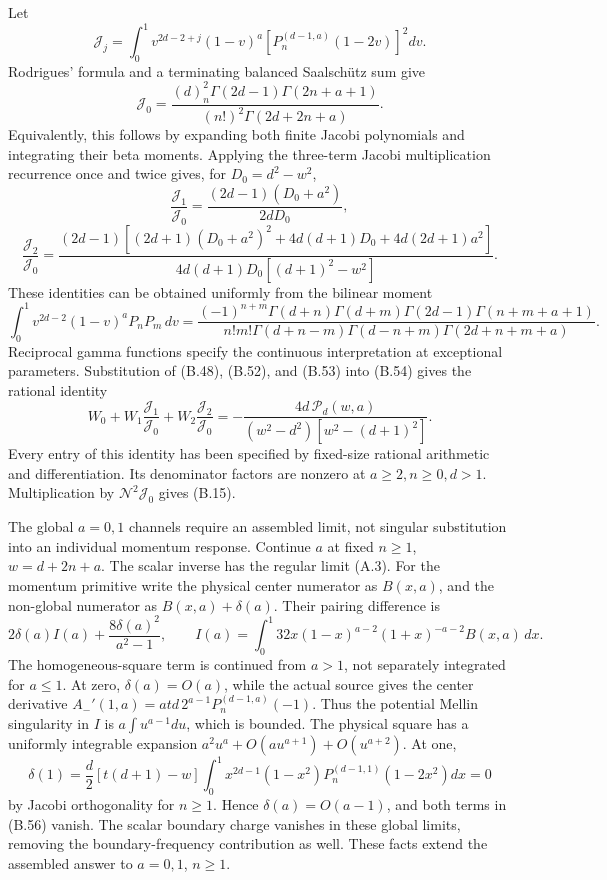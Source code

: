 \documentclass[a4paper,11pt]{article}
\numberwithin{equation}{section}
\begin{document}
Let \[
\mathcal J_j=\int_0^1v^{2d-2+j}(1-v)^a
[P_n^{(d-1,a)}(1-2v)]^2dv .
\] Rodrigues' formula and a terminating balanced Saalschütz sum give \[
\mathcal J_0=\frac{(d)_n^2\Gamma(2d-1)\Gamma(2n+a+1)}
{(n!)^2\Gamma(2d+2n+a)}.
\] Equivalently, this follows by expanding both finite Jacobi polynomials and integrating their beta moments. Applying the three-term Jacobi multiplication recurrence once and twice gives, for \(D_0=d^2-w^2\), \[
\frac{\mathcal J_1}{\mathcal J_0}
=\frac{(2d-1)(D_0+a^2)}{2dD_0},
\] \[
\frac{\mathcal J_2}{\mathcal J_0}
=\frac{(2d-1)[(2d+1)(D_0+a^2)^2
+4d(d+1)D_0+4d(2d+1)a^2]}
{4d(d+1)D_0[(d+1)^2-w^2]} .
\tag{B.54}
\] These identities can be obtained uniformly from the bilinear moment \[
\int_0^1v^{2d-2}(1-v)^aP_nP_m\,dv
=\frac{(-1)^{n+m}\Gamma(d+n)\Gamma(d+m)\Gamma(2d-1)\Gamma(n+m+a+1)}
{n!m!\Gamma(d+n-m)\Gamma(d-n+m)\Gamma(2d+n+m+a)}.
\] Reciprocal gamma functions specify the continuous interpretation at exceptional parameters. Substitution of (B.48), (B.52), and (B.53) into (B.54) gives the rational identity \[
W_0+W_1\frac{\mathcal J_1}{\mathcal J_0}
+W_2\frac{\mathcal J_2}{\mathcal J_0}
=-\frac{4d\,\mathcal P_d(w,a)}
{(w^2-d^2)[w^2-(d+1)^2]} .
\tag{B.55}
\] Every entry of this identity has been specified by fixed-size rational arithmetic and differentiation. Its denominator factors are nonzero at \(a\ge2,n\ge0,d>1\). Multiplication by \(\mathcal N^2\mathcal J_0\) gives (B.15).

The global \(a=0,1\) channels require an assembled limit, not singular substitution into an individual momentum response. Continue \(a\) at fixed \(n\ge1\), \(w=d+2n+a\). The scalar inverse has the regular limit (A.3). For the momentum primitive write the physical center numerator as \(B(x,a)\), and the non-global numerator as \(B(x,a)+\delta(a)\). Their pairing difference is \[
2\delta(a)I(a)+\frac{8\delta(a)^2}{a^2-1},\qquad
I(a)=\int_0^1 32x(1-x)^{a-2}(1+x)^{-a-2}B(x,a)\,dx .
\tag{B.56}
\] The homogeneous-square term is continued from \(a>1\), not separately integrated for \(a\le1\). At zero, \(\delta(a)=O(a)\), while the actual source gives the center derivative \(A_-'(1,a)=atd\,2^{a-1}P_n^{(d-1,a)}(-1)\). Thus the potential Mellin singularity in \(I\) is \(a\int u^{a-1}du\), which is bounded. The physical square has a uniformly integrable expansion \(a^2u^a+O(au^{a+1})+O(u^{a+2})\). At one, \[
\delta(1)=\frac d2[t(d+1)-w]
\int_0^1x^{2d-1}(1-x^2)
P_n^{(d-1,1)}(1-2x^2)dx=0
\] by Jacobi orthogonality for \(n\ge1\). Hence \(\delta(a)=O(a-1)\), and both terms in (B.56) vanish. The scalar boundary charge vanishes in these global limits, removing the boundary-frequency contribution as well. These facts extend the assembled answer to \(a=0,1\), \(n\ge1\).
\end{document}
